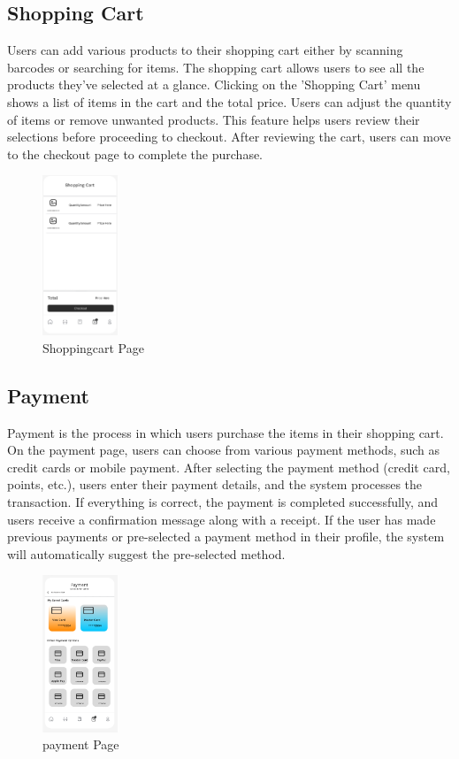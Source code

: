 \documentclass[conference]{IEEEtran}
\begin{document}
\subsection{Shopping Cart}
Users can add various products to their shopping cart either by scanning barcodes or searching for items. The shopping cart allows users to see all the products they've selected at a glance. Clicking on the 'Shopping Cart' menu shows a list of items in the cart and the total price. Users can adjust the quantity of items or remove unwanted products. This feature helps users review their selections before proceeding to checkout. After reviewing the cart, users can move to the checkout page to complete the purchase.

\begin{figure}[H]  %
    \centering  %
    \includegraphics[width=0.2\textwidth]{shoppingcart.PNG}  %
    \caption{Shoppingcart Page}  %
\end{figure}

\subsection{Payment}
Payment is the process in which users purchase the items in their shopping cart. On the payment page, users can choose from various payment methods, such as credit cards or mobile payment. After selecting the payment method (credit card, points, etc.), users enter their payment details, and the system processes the transaction. If everything is correct, the payment is completed successfully, and users receive a confirmation message along with a receipt.
If the user has made previous payments or pre-selected a payment method in their profile, the system will automatically suggest the pre-selected method.
\begin{figure}[H]  %
    \centering  %
    \includegraphics[width=0.2\textwidth]{payment.PNG}  %
    \caption{payment Page}  %
\end{figure}
\end{document}
